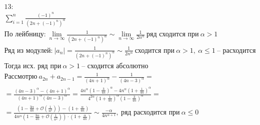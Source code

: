 \documentclass{report}
\begin{document}
\begin{multline}
    \text{13:}\\
    \sum\limits_{i=1}^n \frac{(-1)^n}{(2n + (-1)^n)^{\alpha}}\\
    \text{По лейбницу:}\
    \lim\limits_{n \to \infty} \frac{1}{(2n + (-1)^n)^{\alpha}} \sim
    \lim\limits_{n \to \infty}\frac{1}{2n^{\alpha}}\
    \text{ряд сходится при}\ \alpha > 1\\
    \text{Ряд из модулей:}\
    |a_n| = \frac{1}{(2n + (-1)^n)^{\alpha}} \sim \frac{1}{2n^{\alpha}}\
    \text{сходится при}\ \alpha > 1,\ \alpha \leq 1\ \text{-- расходится}\\
    \text{Тогда исх. ряд при}\ \alpha > 1\ \text{-- сходится абсолютно}\\
    \text{Рассмотрю}\ a_{2n} + a_{2n - 1} = 
    \frac{1}{(4n + 1)^{\alpha}} - \frac{1}{(4n - 3)^{\alpha}} =\\
    = \frac{(4n - 3)^{\alpha} - (4n + 1)^{\alpha}}{(4n + 1)^{\alpha}(4n - 3)^{\alpha}} =
    \frac{4n^{\alpha}(1 - \frac{3}{4n})^{\alpha} - 4n^{\alpha}(1 + \frac{1}{4n})^{\alpha}}
    {4^{2\alpha}(1 + \frac{1}{4n})^{\alpha}(1 - \frac{3}{4n})^{\alpha}} =\\
    = \frac{(1 - \frac{3\alpha}{4n} + \mathcal{O}(\frac{1}{n^2})) - (1 + \frac{\alpha}{4n})}
    {4n^{\alpha}(1 - \frac{3\alpha}{4n} + \mathcal{O}(\frac{1}{n^2}))\cdot (1 + \frac{\alpha}{4n})}
    \sim \frac{-\alpha}{4n^{\alpha + 1}},\ \text{ряд расходится при}\ \alpha \leq 0\\
\end{multline}
\end{document}
